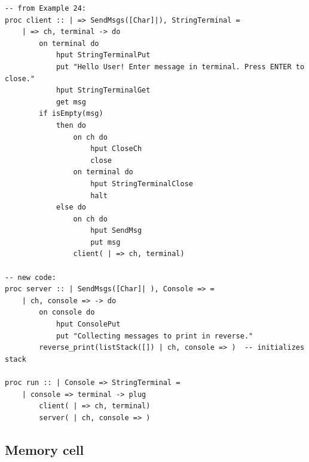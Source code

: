 \documentclass[11pt]{article}
\begin{document}
\begin{appendix}
\begin{lstlisting}
-- from Example 24:
proc client :: | => SendMsgs([Char]|), StringTerminal =
	| => ch, terminal -> do
		on terminal do	
			hput StringTerminalPut
			put "Hello User! Enter message in terminal. Press ENTER to close."
			hput StringTerminalGet
			get msg
		if isEmpty(msg)
			then do
				on ch do 
					hput CloseCh
					close 
				on terminal do
					hput StringTerminalClose	
					halt 
			else do
				on ch do											
					hput SendMsg
					put msg
				client( | => ch, terminal)

-- new code:
proc server :: | SendMsgs([Char]| ), Console => =
	| ch, console => -> do
		on console do
			hput ConsolePut
			put "Collecting messages to print in reverse."
		reverse_print(listStack([]) | ch, console => )	-- initializes stack

proc run :: | Console => StringTerminal = 
    | console => terminal -> plug
        client( | => ch, terminal)
        server( | ch, console => )
\end{lstlisting}


\subsection{Memory cell}
\label{prog:mem-cell}


\end{appendix}
\end{document}
